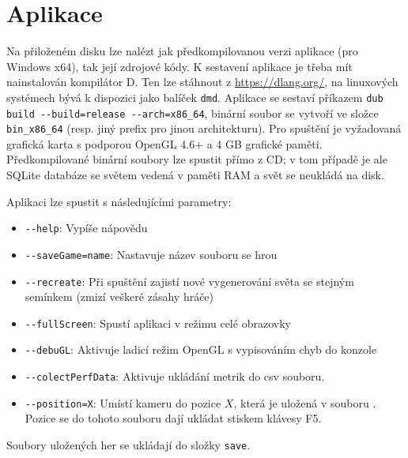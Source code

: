 
\vfill


\chapter{Aplikace} \label{ch:app}
Na přiloženém disku lze nalézt jak předkompilovanou verzi aplikace (pro Windows x64), tak její zdrojové kódy. K sestavení aplikace je třeba mít nainstalován kompilátor D. Ten lze stáhnout z \url{https://dlang.org/}, na linuxových systémech bývá k dispozici jako balíček \verb|dmd|. Aplikace se sestaví příkazem \verb|dub build --build=release --arch=x86_64|, binární soubor se vytvoří ve složce \verb|bin_x86_64| (resp. jiný prefix pro jinou architekturu). Pro spuštění je vyžadovaná grafická karta s podporou OpenGL 4.6+ a 4 GB grafické paměti. Předkompilované binární soubory lze spustit přímo z CD; v tom případě je ale SQLite databáze se světem vedená v paměti RAM a svět se neukládá na disk.

Aplikaci lze spustit s následujícími parametry:
\begin{itemize}
	\item \verb|--help|: Vypíše nápovědu
	\item \verb|--saveGame=name|: Nastavuje název souboru se hrou
	\item \verb|--recreate|: Při spuštění zajistí nové vygenerování světa se stejným semínkem (zmizí veškeré zásahy hráče)
	\item \verb|--fullScreen|: Spustí aplikaci v režimu celé obrazovky
	\item \verb|--debuGL|: Aktivuje ladicí režim OpenGL s vypisováním chyb do konzole
	\item \verb|--colectPerfData|: Aktivuje ukládání metrik do csv souboru.
	\item \verb|--position=X|: Umístí kameru do pozice $X$, která je uložená v souboru . Pozice se do tohoto souboru dají ukládat stiskem klávesy F5.
\end{itemize}

Soubory uložených her se ukládají do složky \verb|save|.

